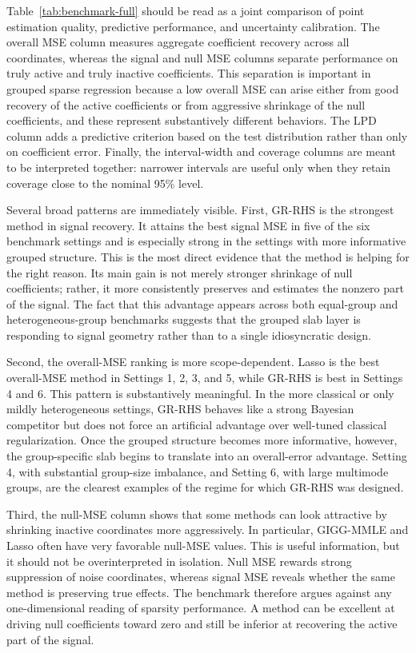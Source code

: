 \documentclass[11pt]{article}
\begin{document}
Table~\ref{tab:benchmark-full} should be read as a joint comparison of point
estimation quality, predictive performance, and uncertainty calibration. The
overall MSE column measures aggregate coefficient recovery across all
coordinates, whereas the signal and null MSE columns separate performance on
truly active and truly inactive coefficients. This separation is important in
grouped sparse regression because a low overall MSE can arise either from good
recovery of the active coefficients or from aggressive shrinkage of the null
coefficients, and these represent substantively different behaviors. The LPD
column adds a predictive criterion based on the test distribution rather than
only on coefficient error. Finally, the interval-width and coverage columns are
meant to be interpreted together: narrower intervals are useful only when they
retain coverage close to the nominal 95\% level.

Several broad patterns are immediately visible. First, GR-RHS is the strongest
method in signal recovery. It attains the best signal MSE in five of the six
benchmark settings and is especially strong in the settings with more
informative grouped structure. This is the most direct evidence that the method
is helping for the right reason. Its main gain is not merely stronger shrinkage
of null coefficients; rather, it more consistently preserves and estimates the
nonzero part of the signal. The fact that this advantage appears across both
equal-group and heterogeneous-group benchmarks suggests that the grouped slab
layer is responding to signal geometry rather than to a single idiosyncratic
design.

Second, the overall-MSE ranking is more scope-dependent. Lasso is the best
overall-MSE method in Settings 1, 2, 3, and 5, while GR-RHS is best in
Settings 4 and 6. This pattern is substantively meaningful. In the more
classical or only mildly heterogeneous settings, GR-RHS behaves like a strong
Bayesian competitor but does not force an artificial advantage over well-tuned
classical regularization. Once the grouped structure becomes more informative,
however, the group-specific slab begins to translate into an overall-error
advantage. Setting 4, with substantial group-size imbalance, and Setting 6,
with large multimode groups, are the clearest examples of the regime for which
GR-RHS was designed.

Third, the null-MSE column shows that some methods can look attractive by
shrinking inactive coordinates more aggressively. In particular, GIGG-MMLE and
Lasso often have very favorable null-MSE values. This is useful information,
but it should not be overinterpreted in isolation. Null MSE rewards strong
suppression of noise coordinates, whereas signal MSE reveals whether the same
method is preserving true effects. The benchmark therefore argues against any
one-dimensional reading of sparsity performance. A method can be excellent at
driving null coefficients toward zero and still be inferior at recovering the
active part of the signal.
\end{document}
